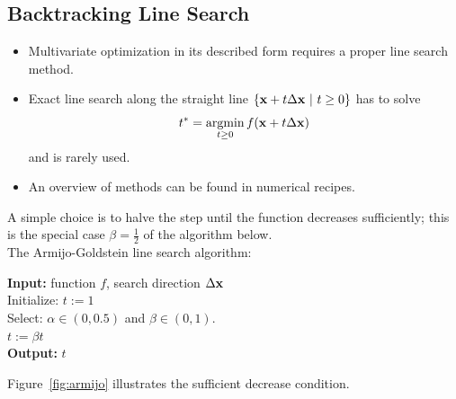 \subsection{Backtracking Line Search}

  \begin{itemize}  
    \item Multivariate optimization in its described form requires a proper line search method.
    \item Exact line search along the straight line $\{\bm{\mathrm{x}} + t\Delta \bm{\mathrm{x}} ~|~ t \geq 0\}$ has to solve
      \begin{displaymath}
        t^* = \operatorname*{argmin}_{t\geq 0} f(\bm{\mathrm{x}} + t\Delta \bm{\mathrm{x}})
      \end{displaymath}
      and is rarely used.
    \item An overview of methods can be found in numerical recipes.
  \end{itemize}
  A simple choice is to halve the step until the function decreases sufficiently; this is the special case $\beta=\frac12$ of the algorithm below.\\
  The Armijo-Goldstein line search algorithm: 

  \begin{algorithmic}
    \STATE \textbf{Input:} function $f$, search direction $\Delta\bm{\mathrm{x}}$\\
    \STATE Initialize: $t:=1$\\
    \STATE Select: $\alpha\in (0,0.5)$ and $\beta\in (0,1)$.\\
      \STATE $t := \beta t$\\
    \EndWhile
    \STATE \textbf{Output:} $t$
  \end{algorithmic}
  Figure~\ref{fig:armijo} illustrates the sufficient decrease condition.

